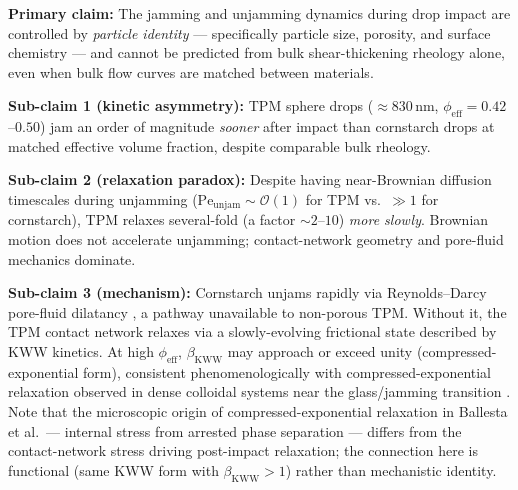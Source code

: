 \documentclass[11pt,letterpaper]{article}
\newcommand{\phieff}{\phi_{\mathrm{eff}}}
\newcommand{\peunj}{\mathrm{Pe}_{\mathrm{unjam}}}
\newcommand{\bkww}{\beta_{\mathrm{KWW}}}
\begin{document}
\begin{claimbox}
\textbf{Primary claim:}
The jamming and unjamming dynamics during drop impact are controlled by
\emph{particle identity} --- specifically particle size, porosity, and surface
chemistry --- and cannot be predicted from bulk shear-thickening rheology alone,
even when bulk flow curves are matched between materials.

\medskip
\textbf{Sub-claim 1 (kinetic asymmetry):}
TPM sphere drops (${\approx}830$\,nm, $\phieff = 0.42$--$0.50$)
jam an order of magnitude \emph{sooner} after impact than cornstarch drops at
matched effective volume fraction, despite comparable bulk rheology.

\medskip
\textbf{Sub-claim 2 (relaxation paradox):}
Despite having near-Brownian diffusion timescales during unjamming
($\peunj \sim \mathcal{O}(1)$ for TPM vs.\ $\gg 1$ for cornstarch),
TPM relaxes several-fold (a factor ${\sim}2$--$10$) \emph{more slowly}. Brownian motion
does not accelerate unjamming; contact-network geometry and pore-fluid
mechanics dominate.

\medskip
\textbf{Sub-claim 3 (mechanism):}
Cornstarch unjams rapidly via Reynolds--Darcy pore-fluid dilatancy
\cite{Mobaseri2026}, a pathway unavailable to non-porous TPM.
Without it, the TPM contact network relaxes via a slowly-evolving
frictional state described by KWW kinetics. At high $\phieff$,
$\bkww$ may approach or exceed unity (compressed-exponential form),
consistent phenomenologically with compressed-exponential relaxation
observed in dense colloidal systems near the glass/jamming transition
\cite{Ballesta2008}. Note that the microscopic origin of compressed-exponential
relaxation in Ballesta et al.\ --- internal stress from arrested phase separation
--- differs from the contact-network stress driving post-impact relaxation; the
connection here is functional (same KWW form with $\bkww > 1$) rather than
mechanistic identity.
\end{claimbox}
\end{document}
